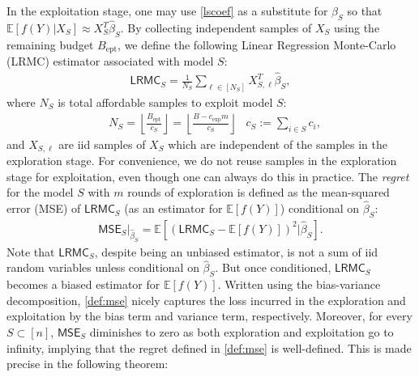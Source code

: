 \documentclass[a4paper,11pt]{article}
\numberwithin{equation}{section}
\theoremstyle{plain}
\theoremstyle{definition}
\def\E{{\mathbb E}}
\def\ext{{\text{ept}}}
\def\mse{{\textsf{MSE}}}
\def\lrmc{{\textsf{LRMC}}}
\begin{document}
In the exploitation stage, one may use \eqref{lscoef} as a substitute for $\beta_S$ so that $\E[f(Y)|X_S]\approx X^T_S\widehat{\beta}_S$.
By collecting independent samples of $X_S$ using the remaining budget $B_{\ext}$, we define the following Linear Regression Monte-Carlo (LRMC) estimator associated with model $S$:
\begin{align}
\lrmc_S = \frac{1}{N_S}\sum_{\ell\in [N_S]}X_{S,\ell}^T\widehat{\beta}_S,\label{LRMC}
\end{align}
where $N_S$ is total affordable samples to exploit model $S$:
\begin{align*}
&N_S = \left\lfloor\frac{B_{\ext}}{c_S}\right\rfloor =  \left\lfloor\frac{B - c_{\exp}m}{c_S}\right\rfloor& c_S := \sum_{i\in S}c_i,
\end{align*}
and $X_{S,\ell}$ are iid samples of $X_S$ which are independent of the samples in the exploration stage. 
For convenience, we do not reuse samples in the exploration stage for exploitation, even though one can always do this in practice.   
The \emph{regret} for the model $S$ with $m$ rounds of exploration is defined as the mean-squared error (MSE) of $\lrmc_S$ (as an estimator for $\E[f(Y)]$) conditional on $\widehat{\beta}_S$:
\begin{align}
\mse_S|_{\widehat{\beta}_S} = \E\left[\left(\lrmc_S - \E[f(Y)]\right)^2\big | \widehat{\beta}_S\right].\label{def:mse}
\end{align}
Note that $\lrmc_S$, despite being an unbiased estimator, is not a sum of iid random variables unless conditional on $\widehat{\beta}_S$. But once conditioned, $\lrmc_S$ becomes a biased estimator for $\E[f(Y)]$. 
Written using the bias-variance decomposition, \eqref{def:mse} nicely captures the loss incurred in the exploration and exploitation by the bias term and variance term, respectively.
Moreover, for every $S\subset [n]$, $\mse_S$ diminishes to zero as both exploration and exploitation go to infinity, implying that the regret defined in \eqref{def:mse} is well-defined. This is made precise in the following theorem:
\end{document}
